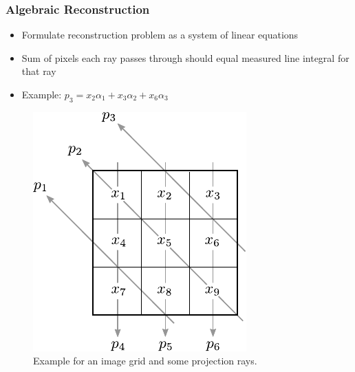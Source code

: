 \begin{frame}
	\frametitle{Algebraic Reconstruction}

	\begin{itemize}
		\item Formulate reconstruction problem as a system of linear equations
		\item Sum of pixels each ray passes through should equal measured line integral for that ray
		\item Example: $p_3 = x_2 \alpha_1 + x_3 \alpha_2 + x_6 \alpha_3$     
	\end{itemize}

	\begin{figure}[tbp]
		\centering
		\includegraphics[height=0.6\textheight]{images/algebraic_1}
		\caption{Example for an image grid and some projection rays.}
	\end{figure}
\end{frame}

